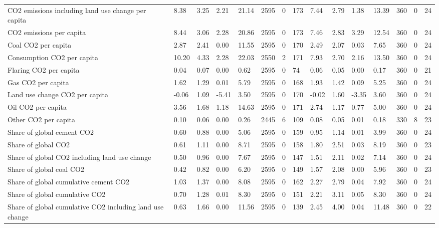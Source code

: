 \begin{longtable}{lllllllllllllll}
CO2 emissions including land use change per capita & 8.38 & 3.25 & 2.21 & 21.14 & 2595 & 0 & 173 & 7.44 & 2.79 & 1.38 & 13.39 & 360 & 0 & 24\\
CO2 emissions per capita & 8.44 & 3.06 & 2.28 & 20.86 & 2595 & 0 & 173 & 7.46 & 2.83 & 3.29 & 12.54 & 360 & 0 & 24\\
Coal CO2 per capita & 2.87 & 2.41 & 0.00 & 11.55 & 2595 & 0 & 170 & 2.49 & 2.07 & 0.03 & 7.65 & 360 & 0 & 24\\
\addlinespace
Consumption CO2 per capita & 10.20 & 4.33 & 2.28 & 22.03 & 2550 & 2 & 171 & 7.93 & 2.70 & 2.16 & 13.50 & 360 & 0 & 24\\
Flaring CO2 per capita & 0.04 & 0.07 & 0.00 & 0.62 & 2595 & 0 & 74 & 0.06 & 0.05 & 0.00 & 0.17 & 360 & 0 & 21\\
Gas CO2 per capita & 1.62 & 1.29 & 0.01 & 5.79 & 2595 & 0 & 168 & 1.93 & 1.42 & 0.09 & 5.25 & 360 & 0 & 24\\
Land use change CO2 per capita & -0.06 & 1.09 & -5.41 & 3.50 & 2595 & 0 & 170 & -0.02 & 1.60 & -3.35 & 3.60 & 360 & 0 & 24\\
Oil CO2 per capita & 3.56 & 1.68 & 1.18 & 14.63 & 2595 & 0 & 171 & 2.74 & 1.17 & 0.77 & 5.00 & 360 & 0 & 24\\
\addlinespace
Other CO2 per capita & 0.10 & 0.06 & 0.00 & 0.26 & 2445 & 6 & 109 & 0.08 & 0.05 & 0.01 & 0.18 & 330 & 8 & 23\\
Share of global cement CO2 & 0.60 & 0.88 & 0.00 & 5.06 & 2595 & 0 & 159 & 0.95 & 1.14 & 0.01 & 3.99 & 360 & 0 & 24\\
Share of global CO2 & 0.61 & 1.11 & 0.00 & 8.71 & 2595 & 0 & 158 & 1.80 & 2.51 & 0.03 & 8.19 & 360 & 0 & 23\\
Share of global CO2 including land use change & 0.50 & 0.96 & 0.00 & 7.67 & 2595 & 0 & 147 & 1.51 & 2.11 & 0.02 & 7.14 & 360 & 0 & 24\\
Share of global coal CO2 & 0.42 & 0.82 & 0.00 & 6.20 & 2595 & 0 & 149 & 1.57 & 2.08 & 0.00 & 5.96 & 360 & 0 & 23\\
\addlinespace
Share of global cumulative cement CO2 & 1.03 & 1.37 & 0.00 & 8.08 & 2595 & 0 & 162 & 2.27 & 2.79 & 0.04 & 7.92 & 360 & 0 & 24\\
Share of global cumulative CO2 & 0.70 & 1.28 & 0.01 & 8.30 & 2595 & 0 & 151 & 2.21 & 3.11 & 0.05 & 8.30 & 360 & 0 & 24\\
Share of global cumulative CO2 including land use change & 0.63 & 1.66 & 0.00 & 11.56 & 2595 & 0 & 139 & 2.45 & 4.00 & 0.04 & 11.48 & 360 & 0 & 22\\

\end{longtable}
